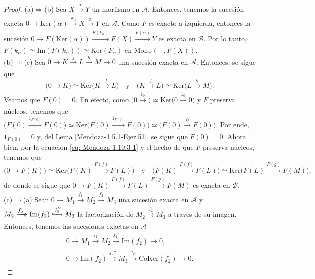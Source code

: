 \documentclass[tesis]{subfiles}
\begin{document}
\begin{proof}\leavevmode

    (a)$\Rightarrow$(b) Sea $X\xrightarrow[]{\alpha}Y$ un morfismo en $\mathscr{A}$. Entonces, tenemos la sucesión exacta $0\to \text{Ker}(\alpha) \xrightarrow[]{k_\alpha} X\xrightarrow[]{\alpha} Y$ en $\mathscr{A}$. Como $F$ es exacto a izquierda, entonces la sucesión $0\to F(\text{Ker}(\alpha))\xrightarrow[]{F(k_\alpha)} F(X)\xrightarrow[]{F(\alpha)}Y$ es exacta en $\mathscr{B}$. Por lo tanto, $F(k_\alpha) \simeq \text{Im}(F(k_\alpha)) \simeq \text{Ker}(F_\alpha)$ en $\text{Mon}_\mathscr{B}(-,F(X))$. \\

    (b)$\Rightarrow$(c) Sea $0\to K\xrightarrow[]{f} L\xrightarrow[]{g} M\to 0$ una sucesión exacta en $\mathscr{A}$. Entonces, se sigue que
    \begin{equation}\label{eq: Mendoza-1.10.3-1}
        \big(0\to K\big) \simeq \text{Ker}\big(K\xrightarrow[]{f} L\big) \quad \text{y} \quad \big(K\xrightarrow[]{f} L\big) \simeq \text{Ker}\big(L\xrightarrow[]{g}M\big).
    \end{equation}
    Veamos que $F(0)=0$. En efecto, como $\big( 0\xrightarrow[]{1_0} \big)\simeq \text{Ker}\big( 0\xrightarrow[]{1_0} 0\big)$ y $F$ preserva núcleos, tenemos que $\big (F(0)\xrightarrow[]{1_{F(0)}} F(0) \big) \simeq \text{Ker}\big( F(0)\xrightarrow[]{1_{F(0)}} F(0) \big) \simeq \big( F(0)\xrightarrow[]{0} F(0) \big)$. Por ende, $1_{F(0)} = 0$ y, del Lema \ref{Mendoza-1.5.1-Ejer.51}, se sigue que $F(0)=0$. Ahora bien, por la ecuación \ref{eq: Mendoza-1.10.3-1} y el hecho de que $F$ preserva núcleos, tenemos que
    \[
        \big( 0\xrightarrow[]{} F(K)\big) \simeq \text{Ker}\big( F(K)\xrightarrow[]{F(f)} F(L) \big) \quad \text{y} \quad \big(F(K)\xrightarrow[]{F(f)} F(L) \big) \simeq \text{Ker}\big( F(L)\xrightarrow[]{F(g)} F(M)\big),
    \] 
    de donde se sigue que $0\to F(K)\xrightarrow[]{F(f)} F(L)\xrightarrow[]{F(g)} F(M)$ es exacta en $\mathscr{B}$. \\

    (c)$\Rightarrow$(a) Sean $0\to M_1\xrightarrow[]{f_1} M_2\xrightarrow[]{f_2} M_3$ una sucesión exacta en $\mathscr{A}$ y $M_2\xrightarrow[]{f_2'}\mathrel{\mkern-14mu}\rightarrow \text{Im}(f_2)\xhookrightarrow{f_2''} M_3$ la factorización de $M_2\xrightarrow[]{f_2} M_3$ a través de su imagen. Entonces, tenemos las sucesiones exactas en $\mathscr{A}$
    \begin{align*}
        0\to M_1\xrightarrow[]{f_1} M_2\xrightarrow[]{f_2'} \text{Im}(f_2) \to 0, \\
        0 \to \text{Im}(f_2) \xrightarrow[]{f_2''} M_3\xrightarrow[]{c_{f_2}} \text{CoKer}(f_2) \to 0.
    \end{align*}
        

\end{proof}
\end{document}
